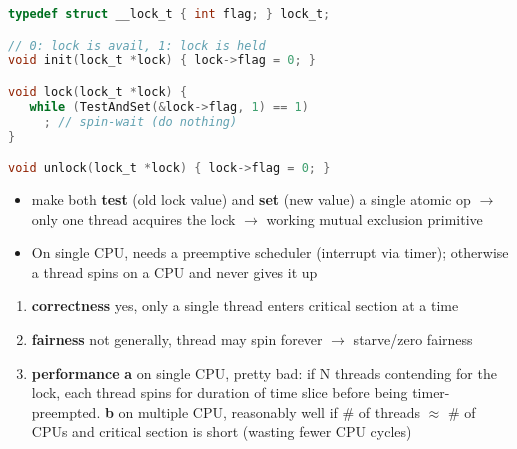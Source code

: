 \documentclass[8pt,a4paper,landscape]{extarticle}
\begin{document}
\begin{multicols*}{3}
\begin{minipage}{.7\linewidth}
\begin{lstlisting}[language=c]
typedef struct __lock_t { int flag; } lock_t;

// 0: lock is avail, 1: lock is held
void init(lock_t *lock) { lock->flag = 0; }

void lock(lock_t *lock) {
   while (TestAndSet(&lock->flag, 1) == 1)
     ; // spin-wait (do nothing)
}

void unlock(lock_t *lock) { lock->flag = 0; }
\end{lstlisting}
\end{minipage}
\begin{minipage}{.3\linewidth}
  \flushleft
  \begin{itemize}
  \item make both \textbf{test} (old lock value) and \textbf{set} (new value) a single atomic op $\to$ only one thread acquires the lock $\to$ working mutual exclusion primitive
  \item On single CPU, needs a preemptive scheduler (interrupt via timer); otherwise a thread spins on a CPU and never gives it up
  \end{itemize}
\end{minipage}
\begin{enumerate}
\item \textbf{correctness} yes, only a single thread enters critical section at a time
\item \textbf{fairness} not generally, thread may spin forever $\to$ starve/zero fairness
\item \textbf{performance} \textbf{a} on single CPU, pretty bad: if N threads contending for the lock, each thread spins for duration of time slice before being timer-preempted. \textbf{b} on multiple CPU, reasonably well if \# of threads $\approx$ \# of CPUs and critical section is short (wasting fewer CPU cycles)
\end{enumerate}


\end{multicols*}
\end{document}
